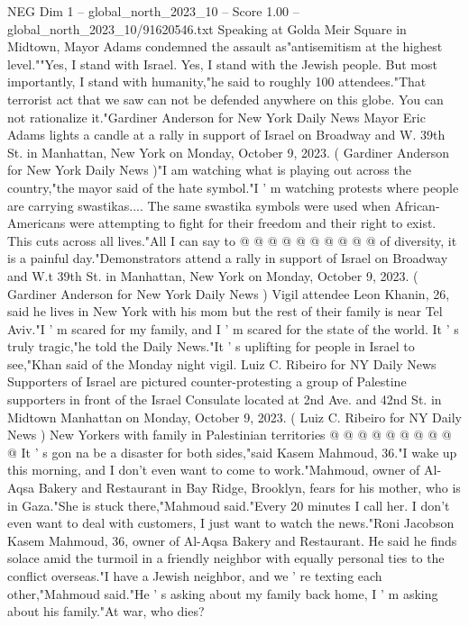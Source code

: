 \begin{textsample}{NEG Dim 1 – global\_north\_2023\_10 – Score 1.00 – global\_north\_2023\_10/91620546.txt}  \label{ex:f1_neg_310}
Speaking at Golda Meir Square in Midtown, Mayor Adams condemned the assault as"antisemitism at the highest level.""Yes, I stand with Israel.
Yes, I stand with the Jewish people.
But most importantly, I stand with humanity,"he said to roughly 100 attendees."That terrorist act that we saw can not be defended anywhere on this globe.
You can not rationalize it."Gardiner Anderson for New York Daily News Mayor Eric Adams lights a candle at a rally in support of Israel on Broadway and W. 39th St. in Manhattan, New York on Monday, October 9, 2023. ( Gardiner Anderson for New York Daily News )"I am watching what is playing out across the country,"the mayor said of the hate symbol."I ' m watching protests where people are carrying swastikas....
The same swastika symbols were used when African-Americans were attempting to fight for their freedom and their right to exist.
This cuts across all lives."All I can say to @ @ @ @ @ @ @ @ @ @ of diversity, it is a painful day."Demonstrators attend a rally in support of Israel on Broadway and W.t 39th St. in Manhattan, New York on Monday, October 9, 2023. ( Gardiner Anderson for New York Daily News ) Vigil attendee Leon Khanin, 26, said he lives in New York with his mom but the rest of their family is near Tel Aviv."I ' m scared for my family, and I ' m scared for the state of the world.
It ' s truly tragic,"he told the Daily News."It ' s uplifting for people in Israel to see,"Khan said of the Monday night vigil.
Luiz C.
Ribeiro for NY Daily News Supporters of Israel are pictured counter-protesting a group of Palestine supporters in front of the Israel Consulate located at 2nd Ave. and 42nd St. in Midtown Manhattan on Monday, October 9, 2023. ( Luiz C.
Ribeiro for NY Daily News ) New Yorkers with family in Palestinian territories @ @ @ @ @ @ @ @ @ @ It ' s gon na be a disaster for both sides,"said Kasem Mahmoud, 36."I wake up this morning, and I don't even want to come to work."Mahmoud, owner of Al-Aqsa Bakery and Restaurant in Bay Ridge, Brooklyn, fears for his mother, who is in Gaza."She is stuck there,"Mahmoud said."Every 20 minutes I call her.
I don't even want to deal with customers, I just want to watch the news."Roni Jacobson Kasem Mahmoud, 36, owner of Al-Aqsa Bakery and Restaurant.
He said he finds solace amid the turmoil in a friendly neighbor with equally personal ties to the conflict overseas."I have a Jewish neighbor, and we ' re texting each other,"Mahmoud said."He ' s asking about my family back home, I ' m asking about his family."At war, who dies?

\end{textsample}
